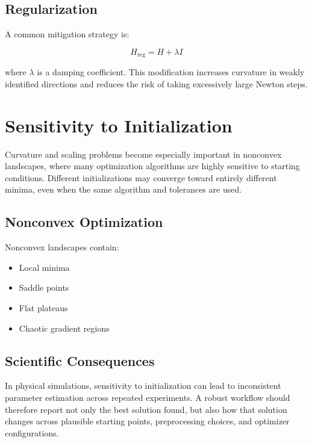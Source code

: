 \subsection{Regularization}

A common mitigation strategy is:

\begin{equation}
H_{\text{reg}} = H + \lambda I
\end{equation}

where $\lambda$ is a damping coefficient. This modification increases curvature in weakly identified directions and reduces the risk of taking excessively large Newton steps.

\section{Sensitivity to Initialization}

Curvature and scaling problems become especially important in nonconvex landscapes, where many optimization algorithms are highly sensitive to starting conditions. Different initializations may converge toward entirely different minima, even when the same algorithm and tolerances are used.

\subsection{Nonconvex Optimization}

Nonconvex landscapes contain:

\begin{itemize}
    \item Local minima
    \item Saddle points
    \item Flat plateaus
    \item Chaotic gradient regions
\end{itemize}

\subsection{Scientific Consequences}

In physical simulations, sensitivity to initialization can lead to inconsistent parameter estimation across repeated experiments. A robust workflow should therefore report not only the best solution found, but also how that solution changes across plausible starting points, preprocessing choices, and optimizer configurations.

